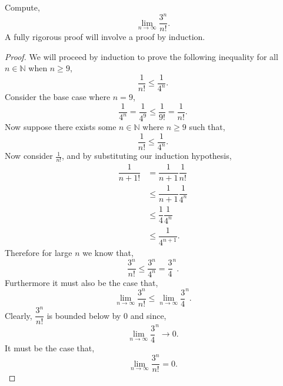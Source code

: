 \documentclass[12pt]{article}
\makeatletter
\theoremstyle{homework}
\newenvironment{exercise}[1]
{\def\@currentlabel{#1}\exercisecore}
{\endexercisecore}
\newcommand{\Nats}{\ensuremath{\mathbb N}}
\makeatother
\begin{document}
\begin{exercise} {3} Compute,
  \begin{equation*}
    \lim_{n \to \infty}\dfrac{3^n}{n!}.
  \end{equation*}
  A fully rigorous proof will involve a proof by induction. \\

\begin{proof}
  We will proceed by induction to prove the following inequality for all $n \in \Nats$ when $n \geq 9$,
  \begin{equation*}
    \dfrac{1}{n!} \le \dfrac{1}{4^n}.
  \end{equation*}
  Consider the base case where $n = 9$,
  \begin{equation*}
    \dfrac{1}{4^n} = \dfrac{1}{4^9} \le \dfrac{1}{9!} = \dfrac{1}{n!}.
  \end{equation*}
  Now suppose there exists some $n \in \Nats$ where $n \geq 9$ such that,
  \begin{equation*}
    \dfrac{1}{n!} \le \dfrac{1}{4^n}.
  \end{equation*}
  Now consider $\frac{1}{n!}$, and by substituting our induction hypothesis,
  \begin{align*}
    \dfrac{1}{n+1!}  &= \dfrac{1}{n+1}\dfrac{1}{n!}\\
    &\le  \dfrac{1}{n+1}\dfrac{1}{4^n}\\
    &\le  \dfrac{1}{4}\dfrac{1}{4^n}\\
    &\le  \dfrac{1}{4^{n+1}}.
  \end{align*}
  Therefore for large $n$ we know that, 
  \begin{equation*}
  \dfrac{3^n}{n!} \le \dfrac{3^n}{4^n} = \dfrac{3}{4}^n.
  \end{equation*}
  Furthermore it must also be the case that, 
  \begin{equation*}
    \lim_{n \to \infty}\dfrac{3^n}{n!} \le  \lim_{n \to \infty}\dfrac{3}{4}^n.
  \end{equation*}
  Clearly, $\dfrac{3^n}{n!}$ is bounded below by $0$ and since,
  \begin{equation*}
    \lim_{n \to \infty}\dfrac{3}{4}^n \to 0.
  \end{equation*}
It must be the case that,
\begin{equation*}
  \lim_{n \to \infty}\dfrac{3^n}{n!} = 0.
\end{equation*}

\end{proof}

\end{exercise}
\vspace{.5in}
\end{document}
